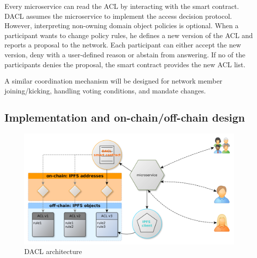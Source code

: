 \documentclass[12pt, conference]{IEEEtran}
\begin{document}
%
%
%


Every microservice can read the ACL by interacting with the smart contract. DACL assumes the microservice to implement the access decision protocol. However, interpreting non-owning domain object policies is optional. When a participant wants to change policy rules, he defines a new version of the ACL and reports a proposal to the network. Each participant can either accept the new version, deny with a user-defined reason or abstain from answering. If no of the participants denies the proposal, the smart contract provides the new ACL list. 

A similar coordination mechanism will be designed for network member joining/kicking, handling voting conditions, and mandate changes.


\subsection{Implementation and on-chain/off-chain design}

\begin{figure}[!h]
  \centering
  \includegraphics[width=\linewidth]{figures/eth-ipfs-design-without-client.png}
  \caption{DACL architecture}
  \label{fig:ipfs-design-without-client}
  \centering
\end{figure}
\end{document}
